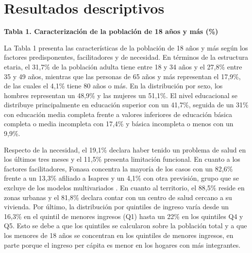\documentclass[
  spanish,
  a4paper,
  oneside]{scrbook}
\begin{document}

\chapter{Resultados descriptivos}\label{resultados-descriptivos}

\textbf{Tabla 1. Caracterización de la población de 18 años y más (\%)}

La Tabla 1 presenta las características de la población de 18 años y más
según los factores predisponentes, facilitadores y de necesidad. En
términos de la estructura etaria, el 31,7\% de la población adulta tiene
entre 18 y 34 años y el 27,8\% entre 35 y 49 años, mientras que las
personas de 65 años y más representan el 17,9\%, de las cuales el 4,1\%
tiene 80 años o más. En la distribución por sexo, los hombres
representan un 48,9\% y las mujeres un 51,1\%. El nivel educacional se
distribuye principalmente en educación superior con un 41,7\%, seguida
de un 31\% con educación media completa frente a valores inferiores de
educación básica completa o media incompleta con 17,4\% y básica
incompleta o menos con un 9,9\%.

Respecto de la necesidad, el 19,1\% declara haber tenido un problema de
salud en los últimos tres meses y el 11,5\% presenta limitación
funcional. En cuanto a los factores facilitadores, Fonasa concentra la
mayoría de los casos con un 82,6\% frente a un 13,3\% afiliado a Isapres
y un 4,1\% con otra previsión, grupo que se excluye de los modelos
multivariados . En cuanto al territorio, el 88,5\% reside en zonas
urbanas y el 81,8\% declara contar con un centro de salud cercano a su
vivienda. Por último, la distribución por quintiles de ingreso varía
desde un 16,3\% en el quintil de menores ingresos (Q1) hasta un 22\% en
los quintiles Q4 y Q5. Esto se debe a que los quintiles se calcularon
sobre la población total y a que los menores de 18 años se concentran en
los quintiles de menores ingresos, en parte porque el ingreso per cápita
es menor en los hogares con más integrantes.
\end{document}
